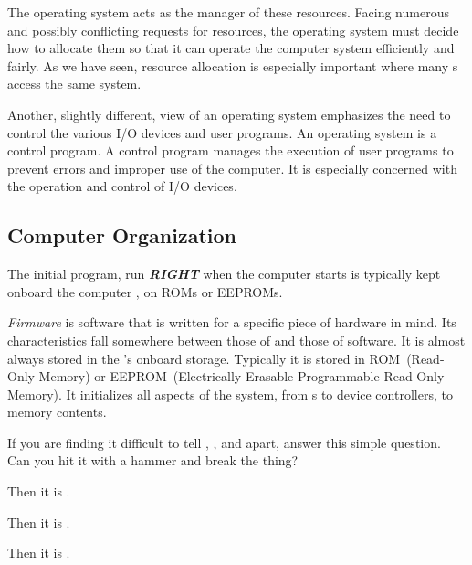 The operating system acts as the manager of these resources.
Facing numerous and possibly conflicting requests for resources, the operating system must decide how to allocate them so that it can operate the computer system efficiently and fairly.
As we have seen, resource allocation is especially important where many s access the same system.

Another, slightly different, view of an operating system emphasizes the need to control the various I/O devices and user programs.
An operating system is a control program.
A control program manages the execution of user programs to prevent errors and improper use of the computer.
It is especially concerned with the operation and control of I/O devices.

\subsection{Computer Organization}\label{subsec:Computer_Organization}
The initial program, run \textbf{\emph{RIGHT}} when the computer starts is typically kept onboard the computer , on ROMs or EEPROMs.

\begin{definition}[Firmware]\label{def:Firmware}
  \emph{Firmware} is software that is written for a specific piece of hardware in mind.
  Its characteristics fall somewhere between those of  and those of software.
  It is almost always stored in the 's onboard storage.
  Typically it is stored in ROM~(Read-Only Memory) or EEPROM~(Electrically Erasable Programmable Read-Only Memory).
  It initializes all aspects of the system, from  s to device controllers, to memory contents.

  \begin{remark}\label{rmk:Firmware_Differentiate}
    If you are finding it difficult to tell , , and  apart, answer this simple question.
    Can you hit it with a hammer and break the thing?
    \begin{description}[noitemsep]
    \item[Yes] Then it is .
    \item[No] Then it is .
    \item[Yes and No] Then it is .
    \end{description}
  \end{remark}
\end{definition}

